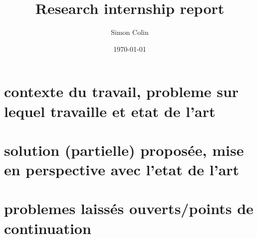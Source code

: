 \documentclass[a4]{article}
\title{Research internship report}
\author{Simon Colin}
\date{\today}
\begin{document}
\maketitle

\section{contexte du travail, probleme sur lequel travaille et etat de l'art}

\section{solution (partielle) proposée, mise en perspective avec l'etat de l'art}

\section{problemes laissés ouverts/points de continuation}
\end{document}
